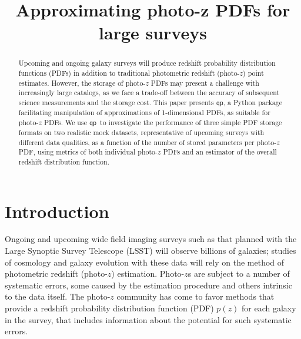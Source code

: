 \documentclass[\docopts]{\docclass}
\newcommand{\qp}{\texttt{qp}}
\newcommand{\pz}{photo-$z$ PDF}
\newcommand{\Pz}{Photo-$z$ PDF}
\begin{document}
\title{ Approximating photo-z PDFs for large surveys }


\begin{abstract}

Upcoming and ongoing galaxy surveys will produce redshift probability
distribution functions (PDFs) in addition to traditional photometric redshift
(photo-$z$) point estimates.  However, the storage of \pz s may present a
challenge with increasingly large catalogs, as we face a trade-off between the
accuracy of subsequent science measurements and the storage cost.  This paper
presents \qp, a Python package facilitating manipulation of approximations of
1-dimensional PDFs, as suitable for \pz s.  We use \qp\ to investigate the
performance of three simple PDF storage formats on two realistic mock datasets, representative of
upcoming surveys with different data qualities, as a function of the number of
stored parameters per \pz, using metrics of both individual \pz s and an
estimator of the overall redshift distribution function.

\end{abstract}


\maketitlepost





\section{Introduction}
\label{sec:intro}


Ongoing and upcoming wide field imaging surveys such as that planned with the Large Synoptic
Survey Telescope (LSST) will observe billions of galaxies; studies of cosmology
and galaxy evolution with these data will rely on the method of photometric redshift
(photo-$z$) estimation.  Photo-$z$s are subject to a number of systematic
errors, some caused by the estimation procedure and others intrinsic to the
data itself.  The photo-$z$ community has come to favor
methods that provide a redshift probability distribution function (PDF) $p(z)$ for each galaxy in the survey,
that includes information about the potential for such systematic errors.
\end{document}
